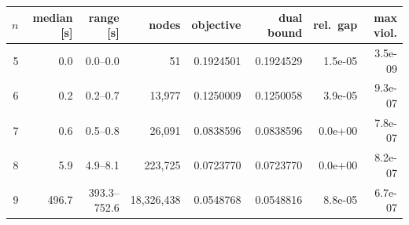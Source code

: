 \begin{tabular}{r r r r r r r r}
\toprule
$n$ & median [s] & range [s] & nodes & objective & dual bound & rel.\ gap & max viol. \\
\midrule
5 & 0.0 & 0.0--0.0 & 51 & 0.1924501 & 0.1924529 & 1.5e-05 & 3.5e-09 \\
6 & 0.2 & 0.2--0.7 & 13,977 & 0.1250009 & 0.1250058 & 3.9e-05 & 9.3e-07 \\
7 & 0.6 & 0.5--0.8 & 26,091 & 0.0838596 & 0.0838596 & 0.0e+00 & 7.8e-07 \\
8 & 5.9 & 4.9--8.1 & 223,725 & 0.0723770 & 0.0723770 & 0.0e+00 & 8.2e-07 \\
9 & 496.7 & 393.3--752.6 & 18,326,438 & 0.0548768 & 0.0548816 & 8.8e-05 & 6.7e-07 \\
\bottomrule
\end{tabular}
